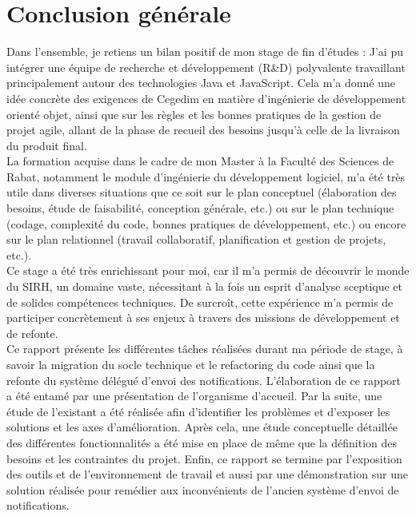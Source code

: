 
{}
\section*{Conclusion générale}

Dans l'ensemble, je retiens un bilan positif de mon stage de fin d'études : J'ai pu intégrer une équipe de recherche et développement (R\&D) polyvalente travaillant principalement autour des technologies Java et JavaScript. Cela m'a donné une idée concrète des exigences de Cegedim en matière d'ingénierie de développement orienté objet, ainsi que sur les règles et les bonnes pratiques de la gestion de projet agile, allant de la phase de recueil des besoins jusqu'à celle de la livraison du produit final.\\

La formation acquise dans le cadre de mon Master à la Faculté des Sciences de Rabat, notamment le module d'ingénierie du développement logiciel, m'a été très utile dans diverses situations que ce soit sur le plan conceptuel (élaboration des besoins, étude de faisabilité, conception générale, etc.) ou sur le plan technique (codage, complexité du code, bonnes pratiques de développement, etc.) ou encore sur le plan relationnel (travail collaboratif, planification et gestion de projets, etc.).\\

Ce stage a été très enrichissant pour moi, car il m'a permis de découvrir le monde du SIRH, un domaine vaste, nécessitant à la fois un esprit d'analyse sceptique et de solides compétences techniques. De surcroît, cette expérience m'a permis de participer concrètement à ses enjeux à travers des missions de développement et de refonte.\\

Ce rapport présente les différentes tâches réalisées durant ma période de stage, à savoir la migration du socle technique et le refactoring du code ainsi que la refonte du système délégué d'envoi des notifications. L'élaboration de ce rapport a été entamé par une présentation de l'organisme d'accueil. Par la suite, une étude de l'existant a été réalisée afin d'identifier les problèmes et d'exposer les solutions et les axes d'amélioration. Après cela, une étude conceptuelle détaillée des différentes fonctionnalités a été mise en place de même que la définition des besoins et les contraintes du projet. Enfin, ce rapport se termine par l'exposition des outils et de l'environnement de travail et aussi par une démonstration sur une solution réalisée pour remédier aux inconvénients de l'ancien système d'envoi de notifications.\\

